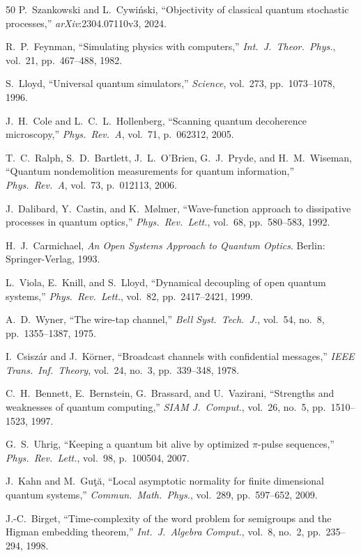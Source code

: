 \documentclass[journal,twocolumn]{IEEEtran}
\theoremstyle{definition}
\theoremstyle{plain}
\begin{document}
\begin{thebibliography}{50}
P.~Szankowski and L.~Cywi\'{n}ski, ``Objectivity of classical
quantum stochastic processes,'' \emph{arXiv}:2304.07110v3, 2024.

R.~P.~Feynman, ``Simulating physics with computers,''
\emph{Int.\ J.\ Theor.\ Phys.}, vol.~21, pp.~467--488, 1982.

S.~Lloyd, ``Universal quantum simulators,'' \emph{Science},
vol.~273, pp.~1073--1078, 1996.

J.~H.~Cole and L.~C.~L.~Hollenberg, ``Scanning quantum decoherence
microscopy,'' \emph{Phys.\ Rev.\ A}, vol.~71, p.~062312, 2005.

T.~C.~Ralph, S.~D.~Bartlett, J.~L.~O'Brien, G.~J.~Pryde, and
H.~M.~Wiseman, ``Quantum nondemolition measurements for quantum
information,'' \emph{Phys.\ Rev.\ A}, vol.~73, p.~012113, 2006.

J.~Dalibard, Y.~Castin, and K.~M{\o}lmer, ``Wave-function approach
to dissipative processes in quantum optics,'' \emph{Phys.\ Rev.\
Lett.}, vol.~68, pp.~580--583, 1992.

H.~J.~Carmichael, \emph{An Open Systems Approach to Quantum
Optics}. Berlin: Springer-Verlag, 1993.

L.~Viola, E.~Knill, and S.~Lloyd, ``Dynamical decoupling of open
quantum systems,'' \emph{Phys.\ Rev.\ Lett.}, vol.~82,
pp.~2417--2421, 1999.

A.~D.~Wyner, ``The wire-tap channel,'' \emph{Bell Syst.\ Tech.\ J.},
vol.~54, no.~8, pp.~1355--1387, 1975.

I.~Csisz\'{a}r and J.~K\"{o}rner, ``Broadcast channels with
confidential messages,'' \emph{IEEE Trans.\ Inf.\ Theory}, vol.~24,
no.~3, pp.~339--348, 1978.

C.~H.~Bennett, E.~Bernstein, G.~Brassard, and U.~Vazirani,
``Strengths and weaknesses of quantum computing,''
\emph{SIAM J.\ Comput.}, vol.~26, no.~5, pp.~1510--1523, 1997.

G.~S.~Uhrig, ``Keeping a quantum bit alive by optimized
$\pi$-pulse sequences,'' \emph{Phys.\ Rev.\ Lett.}, vol.~98,
p.~100504, 2007.

J.~Kahn and M.~Gu\c{t}\u{a}, ``Local asymptotic normality for
finite dimensional quantum systems,'' \emph{Commun.\ Math.\ Phys.},
vol.~289, pp.~597--652, 2009.

J.-C.~Birget, ``Time-complexity of the word problem for semigroups
and the Higman embedding theorem,'' \emph{Int.\ J.\ Algebra
Comput.}, vol.~8, no.~2, pp.~235--294, 1998.

\end{thebibliography}
\end{document}
